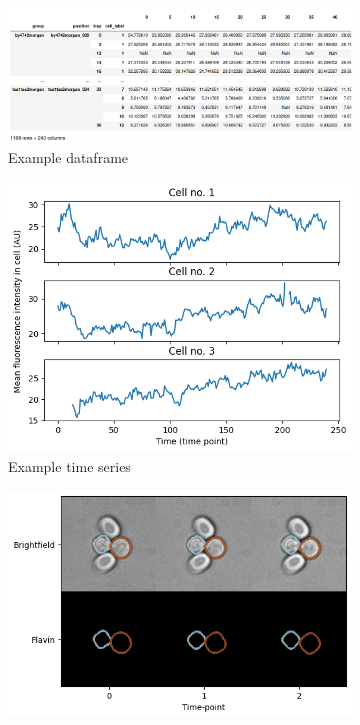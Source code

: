 \begin{figure}
  \centering
  \begin{subfigure}[htpb]{0.9\textwidth}
   \centering
   \includegraphics[width=\textwidth]{example_dataframe}
   \caption{
     Example dataframe
   }
   \label{fig:analysis-example-dataframe}
  \end{subfigure}
  \begin{subfigure}[htpb]{0.5\textwidth}
   \centering
   \includegraphics[width=\textwidth]{example_timeseries}
   \caption{
     Example time series
   }
   \label{fig:analysis-example-timeseries}
  \end{subfigure}
  \begin{subfigure}[htpb]{0.5\textwidth}
   \centering
   \includegraphics[width=\textwidth]{example_images}

\end{subfigure}
\end{figure}
